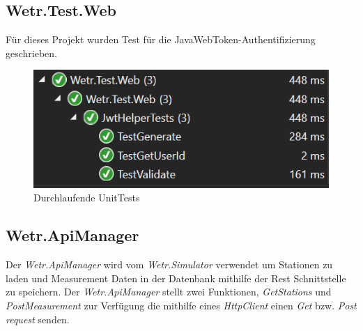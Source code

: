 \subsection{Wetr.Test.Web}
Für dieses Projekt wurden Test für die JavaWebToken-Authentifizierung geschrieben.


\begin{figure}[H]
\centering
\includegraphics[width=.5\textwidth]{pictures/webtest.PNG}
\caption{Durchlaufende UnitTests}
\end{figure}
\raggedright
\subsection{Wetr.ApiManager}
Der \textit{Wetr.ApiManager} wird vom \textit{Wetr.Simulator} verwendet um Stationen zu laden und Measurement Daten in der Datenbank mithilfe der Rest Schnittstelle zu speichern. Der \textit{Wetr.ApiManager} stellt zwei Funktionen, \textit{GetStations} und \textit{PostMeasurement} zur Verfügung die mithilfe eines \textit{HttpClient} einen \textit{Get} bzw. \textit{Post request} senden.

\newpage